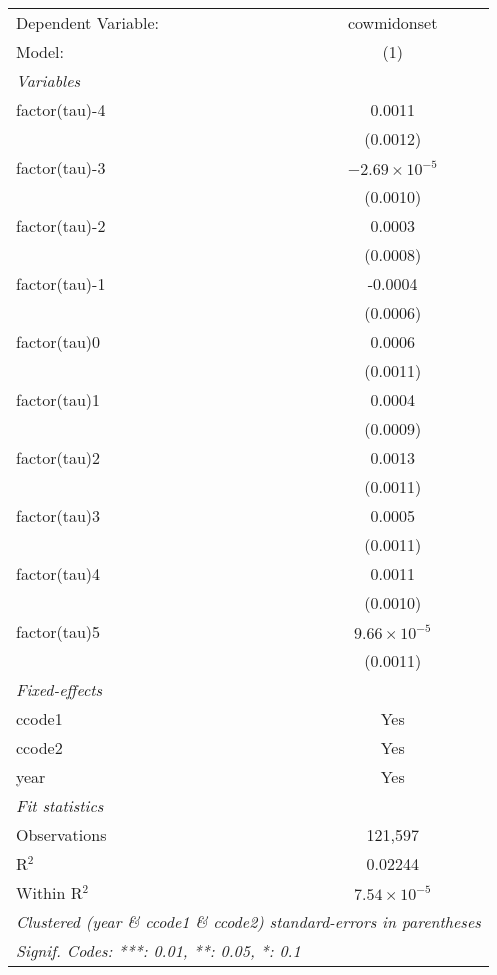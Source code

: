 \begingroup
\centering
\begin{tabular}{lc}
   \tabularnewline \midrule \midrule
   Dependent Variable: & cowmidonset\\  
   Model:              & (1)\\  
   \midrule
   \emph{Variables}\\
   factor(tau)-4       & 0.0011\\   
                       & (0.0012)\\   
   factor(tau)-3       & $-2.69\times 10^{-5}$\\    
                       & (0.0010)\\   
   factor(tau)-2       & 0.0003\\   
                       & (0.0008)\\   
   factor(tau)-1       & -0.0004\\   
                       & (0.0006)\\   
   factor(tau)0        & 0.0006\\   
                       & (0.0011)\\   
   factor(tau)1        & 0.0004\\   
                       & (0.0009)\\   
   factor(tau)2        & 0.0013\\   
                       & (0.0011)\\   
   factor(tau)3        & 0.0005\\   
                       & (0.0011)\\   
   factor(tau)4        & 0.0011\\   
                       & (0.0010)\\   
   factor(tau)5        & $9.66\times 10^{-5}$\\    
                       & (0.0011)\\   
   \midrule
   \emph{Fixed-effects}\\
   ccode1              & Yes\\  
   ccode2              & Yes\\  
   year                & Yes\\  
   \midrule
   \emph{Fit statistics}\\
   Observations        & 121,597\\  
   R$^2$               & 0.02244\\  
   Within R$^2$        & $7.54\times 10^{-5}$\\   
   \midrule \midrule
   \multicolumn{2}{l}{\emph{Clustered (year \& ccode1 \& ccode2) standard-errors in parentheses}}\\
   \multicolumn{2}{l}{\emph{Signif. Codes: ***: 0.01, **: 0.05, *: 0.1}}\\
\end{tabular}
\par\endgroup



